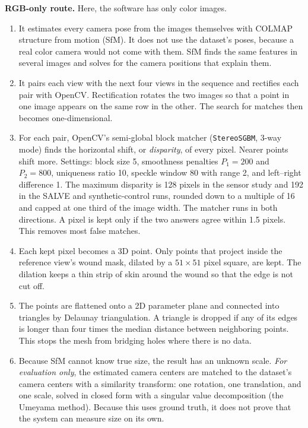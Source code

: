 \documentclass[conference]{IEEEtran}
\begin{document}
\textbf{RGB-only route.} Here, the software has only color images.
\begin{enumerate}
\item It estimates every camera pose from the images themselves with
COLMAP structure from motion (SfM). It does not use the dataset's poses,
because a real color camera would not come with them. SfM finds the same
features in several images and solves for the camera positions that explain
them.
\item It pairs each view with the next four views in the sequence and
rectifies each pair with OpenCV. Rectification rotates the two images so
that a point in one image appears on the same row in the other. The search
for matches then becomes one-dimensional.
\item For each pair, OpenCV's semi-global block matcher (\texttt{StereoSGBM},
3-way mode) finds the horizontal shift, or \emph{disparity}, of every pixel.
Nearer points shift more. Settings: block size 5, smoothness penalties
$P_1=200$ and $P_2=800$, uniqueness ratio 10, speckle window 80 with range
2, and left--right difference 1. The maximum disparity is 128 pixels in the
sensor study and 192 in the SALVE and synthetic-control runs, rounded down
to a multiple of 16 and capped at one third of the image width. The matcher
runs in both directions. A pixel is kept only if the two answers agree
within 1.5 pixels. This removes most false matches.
\item Each kept pixel becomes a 3D point. Only points that project inside
the reference view's wound mask, dilated by a $51\times51$ pixel square, are
kept. The dilation keeps a thin strip of skin around the wound so that the
edge is not cut off.
\item The points are flattened onto a 2D parameter plane and connected into
triangles by Delaunay triangulation. A triangle is dropped if any of its
edges is longer than four times the median distance between neighboring
points. This stops the mesh from bridging holes where there is no data.
\item Because SfM cannot know true size, the result has an unknown scale.
\emph{For evaluation only}, the estimated camera centers are matched to the
dataset's camera centers with a similarity transform: one rotation, one
translation, and one scale, solved in closed form with a singular value
decomposition (the Umeyama method). Because this uses ground truth, it does
not prove that the system can measure size on its own.
\end{enumerate}
\end{document}
